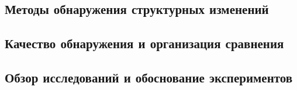 \documentclass[bachelor, och, diploma]{SCWorks}
\begin{document}
\subsection{Методы обнаружения структурных изменений}

\subsection{Качество обнаружения и организация сравнения}

\subsection{Обзор исследований и обоснование экспериментов}

\clearpage








\end{document}

